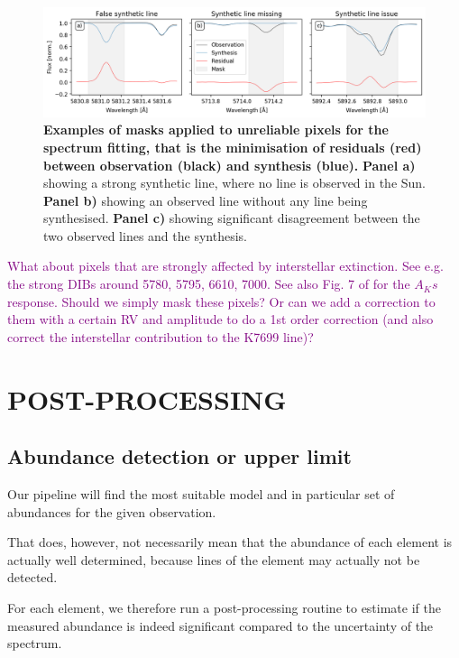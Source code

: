 \documentclass[
  journal=pasa,
  manuscript=research-paper, %
  year=2021,
  volume=37,
]{cup-journal}
\newcommand{\SB}[1]{{\textcolor{purple}{#1}}}
\begin{document}
\begin{figure}[hbt!]
 \centering  
 \includegraphics[width=\textwidth]{figures/example_masking_sun.png}
\caption{\textbf{Examples of masks applied to unreliable pixels for the spectrum fitting, that is the minimisation of residuals (red) between observation (black) and synthesis (blue).} \textbf{Panel a)} showing a strong synthetic line, where no line is observed in the Sun. \textbf{Panel b)} showing an observed line without any line being synthesised. \textbf{Panel c)} showing significant disagreement between the two observed lines and the synthesis.} \label{fig:example_masking_sun}
\end{figure}

\SB{What about pixels that are strongly affected by interstellar extinction. See e.g. the strong DIBs around 5780, 5795, 6610, 7000. See also Fig. 7 of \citep{Buder2018} for the $A_Ks$ response. Should we simply mask these pixels? Or can we add a correction to them with a certain RV and amplitude to do a 1st order correction (and also correct the interstellar contribution to the K7699 line)?}

\section{POST-PROCESSING} \label{sec:post_processing}

\subsection{Abundance detection or upper limit}

Our pipeline will find the most suitable model and in particular set of abundances for the given observation.

That does, however, not necessarily mean that the abundance of each element is actually well determined, because lines of the element may actually not be detected.

For each element, we therefore run a post-processing routine to estimate if the measured abundance is indeed significant compared to the uncertainty of the spectrum.
\end{document}
